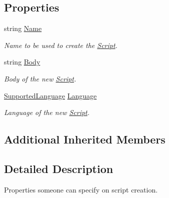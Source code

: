 \subsection*{Properties}
\begin{DoxyCompactItemize}
\item 
string \mbox{\hyperlink{class_code_a_friend_1_1_data_model_1_1_user_1_1_add_script_command_a1863594cfd17327344a9b5d11f6ab2de}{Name}}
\begin{DoxyCompactList}\small\item\em Name to be used to create the \mbox{\hyperlink{class_code_a_friend_1_1_data_model_1_1_script}{Script}}.\end{DoxyCompactList}\item 
string \mbox{\hyperlink{class_code_a_friend_1_1_data_model_1_1_user_1_1_add_script_command_a4c4f566ef6ce3878281ea811bd398234}{Body}}
\begin{DoxyCompactList}\small\item\em Body of the new \mbox{\hyperlink{class_code_a_friend_1_1_data_model_1_1_script}{Script}}.\end{DoxyCompactList}\item 
\mbox{\hyperlink{namespace_code_a_friend_1_1_data_model_a13e088c525db1b03a4de75420ced79b2}{Supported\+Language}} \mbox{\hyperlink{class_code_a_friend_1_1_data_model_1_1_user_1_1_add_script_command_a9abdf5a97813615f8a7114de59ef1f40}{Language}}
\begin{DoxyCompactList}\small\item\em Language of the new \mbox{\hyperlink{class_code_a_friend_1_1_data_model_1_1_script}{Script}}.\end{DoxyCompactList}\end{DoxyCompactItemize}
\subsection*{Additional Inherited Members}


\subsection{Detailed Description}
Properties someone can specify on script creation.



